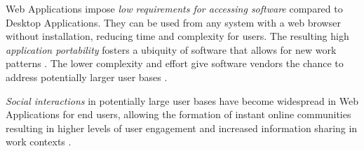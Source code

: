 \glspl{Web Application} impose \emph{low requirements for accessing software} compared to \glspl{Desktop Application}.
They can be used from any system with a \Gls{web} browser without installation, reducing time and complexity for users.
The resulting high \emph{application portability} \autocite{Gitzel2007WebEngineeringMDD} fosters a ubiquity of software that allows for new work patterns \autocite{Bitkom2013Arbeit30}. %
The lower complexity and effort give software vendors the chance to address potentially larger user bases \autocite{ForresterResearch2011Modernization}.

\emph{Social interactions} in potentially large user bases have become widespread in \glspl{Web Application} for end users, allowing the formation of instant online communities \autocite{Bressler2000OnlineCommunities} resulting in higher levels of user engagement \autocite{Bressler2000OnlineCommunities} and increased information sharing in work contexts \autocite[cf.~\emph{Shareconomy}][]{Bitkom2013Arbeit30}.


